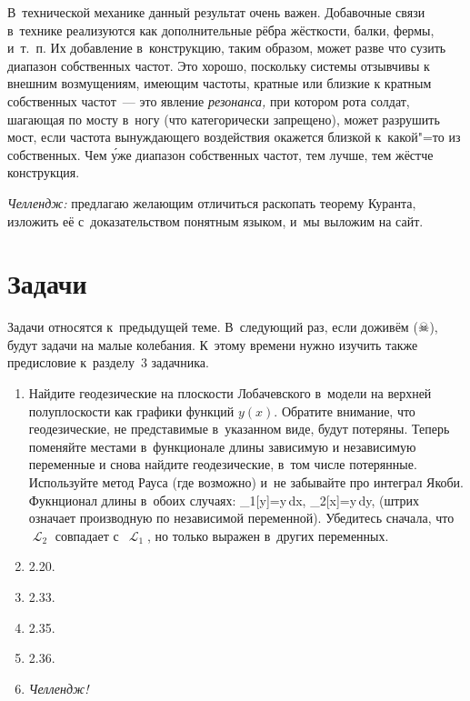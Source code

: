 \documentclass[a4paper,11pt]{article}
\def\[#1\]{\begin{align*}#1\end{align*}}
\newcommand\slashfrac[2]{{#1/#2}}
\theoremstyle{definition}
\begin{document}
В~технической механике данный результат очень важен. Добавочные связи в~технике
реализуются как дополнительные рёбра жёсткости, балки, фермы, и~т.~п. Их
добавление в~конструкцию, таким образом, может разве что сузить диапазон
собственных частот. Это хорошо, поскольку системы отзывчивы к внешним
возмущениям, имеющим частоты, кратные или близкие к кратным собственных
частот~— это явление \emph{резонанса,} при котором рота солдат, шагающая по
мосту в~ногу (что категорически запрещено), может разрушить мост, если частота
вынуждающего воздействия окажется близкой к~какой"=то из собственных. Чем у́же
диапазон собственных частот, тем лучше, тем жёстче конструкция.

\emph{Челлендж:} предлагаю желающим отличиться раскопать теорему Куранта,
изложить её с~доказательством понятным языком, и~мы выложим на сайт.

\section{Задачи}

Задачи относятся к~предыдущей теме. В~следующий раз, если доживём
({☠}), будут задачи на малые колебания. К~этому времени
нужно изучить также предисловие к~разделу~3 задачника.

\begin{enumerate}

\item
Найдите геодезические на плоскости Лобачевского в~модели на верхней
полуплоскости как графики функций $y(x)$. Обратите внимание, что геодезические,
не представимые в~указанном виде, будут потеряны. Теперь поменяйте местами
в~функционале длины зависимую и независимую переменные и снова найдите
геодезические, в~том числе потерянные. Используйте метод Рауса (где возможно)
и~не забывайте про интеграл Якоби. Фукнционал длины в~обоих случаях:
	\[
	\mscrL_1[y]=\int{}y\,dx,
	\quad
	\mscrL_2[x]=\int\frac{x'\sqrt{1+\slashfrac1{x'}^2}}y\,dy,
	\]
(штрих означает производную по независимой переменной). Убедитесь сначала, что
$\mscrL_2$ совпадает с~$\mscrL_1$, но только выражен в~других переменных.

\item
2.20.

\item
2.33.

\item
2.35.

\item
2.36.

\item
\emph{Челлендж!}

\end{enumerate}
\end{document}
